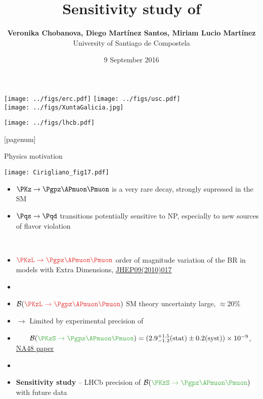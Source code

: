 \documentclass[9pt,hyperref={unicode},utf8]{beamer}
\title[\KsPizMuMu]{\bf Sensitivity study of \texorpdfstring{\KsPizMuMu}{KS->pi0mu+mu-}}
\author[Veronika Chobanova]{\textbf{Veronika Chobanova, Diego Mart\'{i}nez Santos, Miriam Lucio Mart\'{i}nez}\\ University of Santiago de Compostela}
\date{9 September 2016}
\begin{document}
\begin{frame}
           
    \titlepage
    \begin{minipage}{0.69\textwidth}
      \texttt{[image: ../figs/erc.pdf]}
      \texttt{[image: ../figs/usc.pdf]}\\
      \texttt{[image: ../figs/XuntaGalicia.jpg]}\hspace{5.5cm}
    \end{minipage}
    \begin{minipage}{0.3\textwidth}
      \texttt{[image: ../figs/lhcb.pdf]}
    \end{minipage}
\end{frame}

[pagenum]
 
\begin{frame}{Physics motivation}
 \begin{minipage}{0.35\textwidth}
  \texttt{[image: Cirigliano\_fig17.pdf]}
 \end{minipage}
 \begin{minipage}{0.64\textwidth}
  \begin{itemize}
  \setlength\itemsep{1.2em}
   \item $\PKz\to\Pgpz\APmuon\Pmuon$ is a very rare decay, strongly supressed in the SM
   \item $\Pqs\to\Pqd$ transitions potentially sensitive to NP, especially to new sources of flavor violation
  \end{itemize}
 \end{minipage}\\
 \vspace{0.5cm}
  \begin{itemize}
     \item $\textcolor{red}{\PKzL\to\Pgpz\APmuon\Pmuon}$ order of magnitude variation of the BR in models
     with Extra Dimensions,  \href{arXiv:0912.1625 [hep-ph]}{\underline{JHEP09(2010)017}}
     \item[]
     \item ${\cal B}(\textcolor{red}{\PKzL\to\Pgpz\APmuon\Pmuon})$ SM theory uncertainty large, $\approx 20\%$
     \item[] $\rightarrow$ Limited by experimental precision of
     \item[] \textcolor{white}{$\rightarrow$} ${\cal B}(\textcolor{green}{\PKzS\to\Pgpz\APmuon\Pmuon})=(2.9^{+1.5}_{-1.2}\text{(stat)}\pm0.2\text{(syst)})\times10^{-9}$,
     \href{https://cds.cern.ch/record/777240/files/phep-2004-025.pdf}{\underline{NA48 paper}}
     \item[]
     \item \textbf{Sensitivity study} -- LHCb precision of ${\cal B}(\textcolor{green}{\PKzS\to\Pgpz\APmuon\Pmuon})$ with future data
  \end{itemize}
\end{frame}
\end{document}
